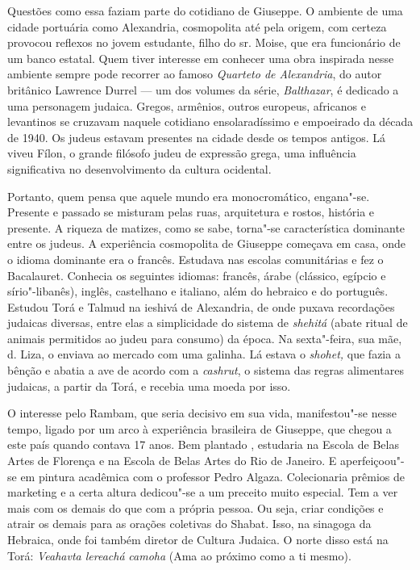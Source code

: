 \asterisc

Questões como essa faziam parte do cotidiano de Giuseppe. O ambiente de
uma cidade portuária como Alexandria, cosmopolita até pela origem, com
certeza provocou reflexos no jovem estudante, filho do sr. Moise, que
era funcionário de um banco estatal. Quem tiver interesse em conhecer
uma obra inspirada nesse ambiente sempre pode recorrer ao famoso
\emph{Quarteto de Alexandria}, do autor britânico Lawrence Durrel --- um
dos volumes da série, \emph{Balthazar}, é dedicado a uma personagem
judaica. Gregos, armênios, outros europeus, africanos e levantinos se
cruzavam naquele cotidiano ensolaradíssimo e empoeirado da década de
1940. Os judeus estavam presentes na cidade desde os tempos antigos. Lá
viveu Fílon, o grande filósofo judeu de expressão grega, uma influência
significativa no desenvolvimento da cultura ocidental.

Portanto, quem pensa que aquele mundo era monocromático, engana"-se.
Presente e passado se misturam pelas ruas, arquitetura e rostos,
história e presente. A riqueza de matizes, como se sabe, torna"-se
característica dominante entre os judeus. A experiência cosmopolita de
Giuseppe começava em casa, onde o idioma dominante era o francês.
Estudava nas escolas comunitárias e fez o Bacalauret. Conhecia os
seguintes idiomas: francês, árabe (clássico, egípcio e sírio"-libanês),
inglês, castelhano e italiano, além do hebraico e do português. Estudou
Torá e Talmud na ieshivá de Alexandria, de onde puxava recordações
judaicas diversas, entre elas a simplicidade do sistema de
\emph{shehitá} (abate ritual de animais permitidos ao judeu para
consumo) da época. Na sexta"-feira, sua mãe, d. Liza, o enviava ao
mercado com uma galinha. Lá estava o \emph{shohet,} que fazia a bênção e
abatia a ave de acordo com a \emph{cashrut}, o sistema das regras
alimentares judaicas, a partir da Torá, e recebia uma moeda por isso.

O interesse pelo Rambam, que seria decisivo em sua vida, manifestou"-se
nesse tempo, ligado por um arco à experiência brasileira de Giuseppe,
que chegou a este país quando contava 17 anos. Bem plantado , estudaria
na Escola de Belas Artes de Florença e na Escola de Belas Artes do Rio
de Janeiro. E aperfeiçoou"-se em pintura acadêmica com o professor Pedro
Algaza. Colecionaria prêmios de marketing e a certa altura dedicou"-se a
um preceito muito especial. Tem a ver mais com os demais do que com a
própria pessoa. Ou seja, criar condições e atrair os demais para as
orações coletivas do Shabat. Isso, na sinagoga da Hebraica, onde foi
também diretor de Cultura Judaica. O norte disso está na Torá:
\emph{Veahavta lereachá} \emph{camoha} (Ama ao próximo como a ti mesmo).

